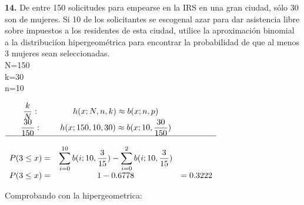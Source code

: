 \documentclass[12pt, letterpaper]{article}
\begin{document}
    \textbf{14.} De entre 150 solicitudes para empearse en la IRS en una gran ciudad, s\'olo 30 son de mujeres. Si 10 de los solicitantes se escogenal azar para dar asistencia libre sobre impuestos a los residentes de esta ciudad, utilice la aproximaci\'on binomial a la distribuci\'ion hipergeom\'etrica para encontrar la probabilidad de que al menos 3 mujeres sean seleccionadas.\\
    N=150\\
    k=30\\
    n=10\\
    \begin{center}
        \begin{math}
            \begin{array}{ccc}
                \displaystyle\frac{k}{N} :&  h(x;N,n,k) \approx b(x;n,p)&\\
                \displaystyle\frac{30}{150} :&  h(x;150,10,30) \approx b(x;10,\displaystyle\frac{30}{150})&\\
                \hline\\
                P(3\leq x)=&\displaystyle\sum^{10}_{i=0} b(i;10,\displaystyle\frac{3}{15})- \displaystyle\sum^{2}_{i=0} b(i;10,\displaystyle\frac{3}{15})&\\
                P(3 \leq x)=& 1-0.6778&=0.3222\\
            \end{array}
        \end{math}
    \end{center}\vskip1cm
    Comprobando con la hipergeometrica:\\
\end{document}
